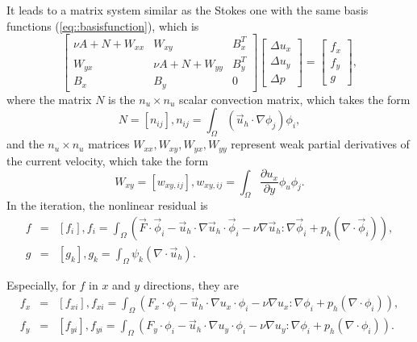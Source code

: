 \documentclass[a4paper]{article}
\begin{document}
It leads to a matrix system similar as the Stokes one with the same
basis functions (\ref{eq::basisfunction}), which is
\begin{equation}
\left[ \begin{array}{ccc}
\nu A + N + W_{xx} & W_{xy} & B_x^T \\
W_{yx} & \nu A + N + W_{yy} & B_y^T \\
B_x & B_y & 0
\end{array}
\right]
\left[\begin{array}{ccc}
\Delta u_x\\
\Delta u_y\\
\Delta p
\end{array}
\right] =
\left[\begin{array}{ccc}
f_x\\
f_y\\
g
\end{array}
\right],
\label{Navier-Stokes}
\end{equation}
where the matrix $N$ is the $n_u \times n_u$ scalar convection matrix, which takes the form
\begin{equation}
N = [n_{ij}], n_{ij} = \int_{\Omega} (\vec{u}_h\cdot \nabla\phi_j)\phi_i,
\label{mt::N}
\end{equation}
and the $n_u\times n_u$ matrices $W_{xx}, W_{xy}, W_{yx}, W_{yy}$
represent weak partial derivatives of the current velocity, which take the form
\begin{equation}
W_{xy} = [w_{xy,ij}], w_{xy,ij} = \int_{\Omega} \frac{\partial u_x}{\partial y}\phi_u \phi_j.
\label{mt::W}
\end{equation}
In the iteration, the nonlinear residual is
\begin{equation}
\begin{array}{rcl}
f &=& [f_i], f_i = \int_{\Omega}(\vec{F} \cdot \vec{\phi}_i -
\vec{u}_h \cdot \nabla \vec{u}_h \cdot \vec{\phi}_i - \nu \nabla
\vec{u}_h : \nabla \vec{\phi}_i + p_h(\nabla \cdot \vec{\phi}_i)), \\ g
& = & [g_k], g_k = \int_{\Omega} \psi_k(\nabla \cdot \vec{u}_h).
\end{array}
\end{equation}

Especially, for $f$ in $x$ and $y$ directions, they are
\begin{equation}
\begin{array}{rcl}
f_x & = & [f_{xi}], f_{xi} = \int_{\Omega}(F_x \cdot \phi_i -
\vec{u}_h \cdot \nabla u_x \cdot \phi_i - \nu \nabla u_x : \nabla
\phi_i + p_h(\nabla \cdot \phi_i)), \\ f_y & = & [f_{yi}], f_{yi} =
\int_{\Omega}(F_y \cdot \phi_i - \vec{u}_h \cdot \nabla u_y \cdot
\phi_i - \nu \nabla u_y : \nabla \phi_i + p_h(\nabla \cdot \phi_i)).
\label{mt::f}
\end{array}
\end{equation}
\end{document}
